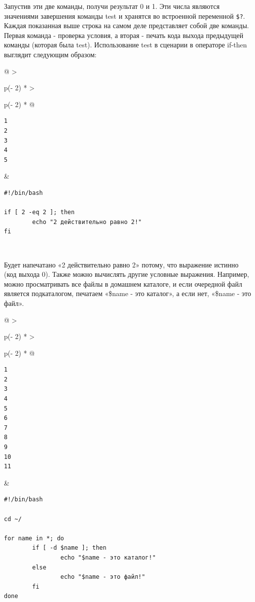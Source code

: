 \documentclass{report}
\begin{document}
Запустив эти две команды, получи результат 0 и 1. Эти числа являются
значениями завершения команды test и хранятся во встроенной переменной
\texttt{\$?}. Каждая показанная выше строка на самом деле представляет
собой две команды. Первая команда - проверка условия, а вторая - печать
кода выхода предыдущей команды (которая была test). Использование test в
сценарии в операторе if-then выглядит следующим образом:

\begin{longtable}[]{@{}
  >{\raggedright\arraybackslash}p{(\columnwidth - 2\tabcolsep) * }
  >{\raggedright\arraybackslash}p{(\columnwidth - 2\tabcolsep) * }@{}}
\toprule
\endhead
\begin{minipage}[t]{\linewidth}\raggedright
\begin{verbatim}
1
2
3
4
5
\end{verbatim}
\end{minipage} & \begin{minipage}[t]{\linewidth}\raggedright
\begin{verbatim}
#!/bin/bash

if [ 2 -eq 2 ]; then
        echo "2 действительно равно 2!"
fi
\end{verbatim}
\end{minipage} \\ \addlinespace
\bottomrule
\end{longtable}

Будет напечатано «2 действительно равно 2» потому, что выражение истинно
(код выхода 0). Также можно вычислять другие условные выражения.
Например, можно просматривать все файлы в домашнем каталоге, и если
очередной файл является подкаталогом, печатаем «\$name - это каталог», а
если нет, «\$name - это файл».

\begin{longtable}[]{@{}
  >{\raggedright\arraybackslash}p{(\columnwidth - 2\tabcolsep) * }
  >{\raggedright\arraybackslash}p{(\columnwidth - 2\tabcolsep) * }@{}}
\toprule
\endhead
\begin{minipage}[t]{\linewidth}\raggedright
\begin{verbatim}
1
2
3
4
5
6
7
8
9
10
11
\end{verbatim}
\end{minipage} & \begin{minipage}[t]{\linewidth}\raggedright
\begin{verbatim}
#!/bin/bash

cd ~/

for name in *; do
        if [ -d $name ]; then
                echo "$name - это каталог!"
        else
                echo "$name - это файл!"
        fi
done
\end{verbatim}
\end{minipage} \\ \addlinespace
\bottomrule
\end{longtable}
\end{document}
